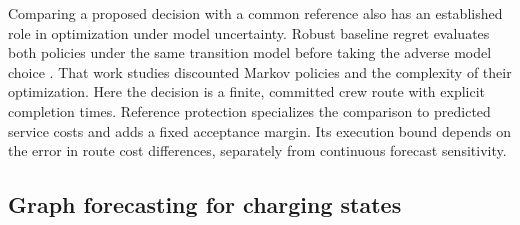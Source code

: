 \documentclass[journal]{IEEEtran}
\providecommand{\DIFadd}[1]{{\protect\color{blue}\uwave{#1}}} %
\providecommand{\DIFaddbegin}{} %
\providecommand{\DIFaddend}{} %
\newcommand{\DIFaddincludegraphics}[2][]{{\color{blue}\fbox{\DIFOincludegraphics[#1]{#2}}}} %
\DeclareRobustCommand{\DIFaddbegin}{\DIFOaddbegin \let\includegraphics\DIFaddincludegraphics} %
\DeclareRobustCommand{\DIFaddend}{\DIFOaddend \let\includegraphics\DIFOincludegraphics} %
\renewcommand{\DIFaddbegin}{}
\renewcommand{\DIFaddend}{}
\renewcommand{\DIFadd}[1]{{\color{blue}#1}}
\renewcommand{\DIFaddincludegraphics}[2][]{{\setlength{\fboxsep}{-\fboxrule}\color{blue}\fbox{\DIFOincludegraphics[#1]{#2}}}}
\begin{document}
\DIFaddbegin \DIFadd{Comparing a proposed decision with a common reference also has an established
role in optimization under model uncertainty.  Robust baseline regret
evaluates both policies under the same transition model before taking the
adverse model choice }\cite{petrik2016baseline}\DIFadd{.  That work studies discounted
Markov policies and the complexity of their optimization.  Here the decision
is a finite, committed crew route with explicit completion times.  Reference
protection specializes the comparison to predicted service costs and adds a
fixed acceptance margin.  Its execution bound depends on the error in route
cost differences, separately from continuous forecast sensitivity.
}

\DIFaddend \subsection{Graph forecasting for charging states}
\end{document}
